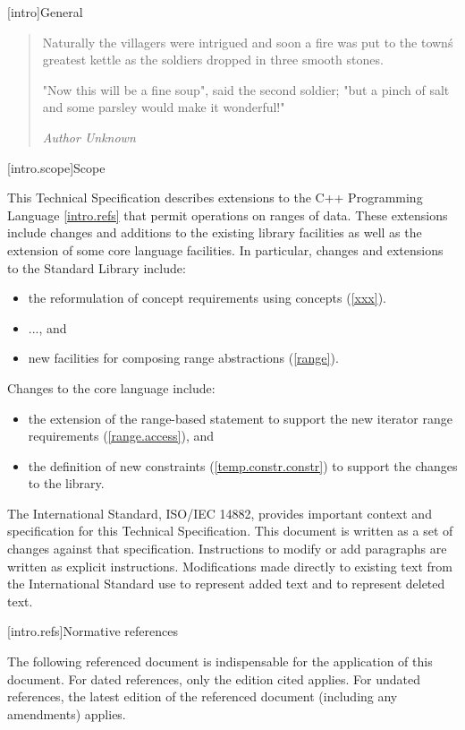 
[intro]{General}

\begin{quote}
Naturally the villagers were intrigued and soon a fire was put to the town\'s greatest
kettle as the soldiers dropped in three smooth stones.

"Now this will be a fine soup", said the second soldier;
"but a pinch of salt and some parsley would make it wonderful!"
\begin{flushright}
\textemdash \textit{Author Unknown}
\end{flushright}
\end{quote}

[intro.scope]{Scope}

\pnum
This Technical Specification describes extensions to the C++
Programming Language \ref{intro.refs} that
permit operations on ranges of data. These extensions include
changes and additions to the existing library facilities as well
as the extension of some core language facilities. In particular,
changes and extensions to the Standard Library include:
\begin{itemize}
\item the reformulation of concept requirements using concepts (\ref{xxx}).
\item ..., and
\item new facilities for composing range abstractions (\ref{range}).
\end{itemize}
%
Changes to the core language include:
\begin{itemize}
\item the extension of the range-based  statement to support
the new iterator range requirements (\ref{range.access}), and
\item the definition of new constraints (\ref{temp.constr.constr}) to
support the changes to the library.
\end{itemize}

\pnum
The International Standard, ISO/IEC 14882, provides important context
and specification for this Technical Specification. This document is
written as a set of changes against that specification. Instructions
to modify or add paragraphs are written as explicit instructions.
Modifications made directly to existing text from the International
Standard use  to represent added text and
 to represent deleted text.


[intro.refs]{Normative references}

\pnum
The following referenced document is indispensable for the
application of this document. For dated references, only the
edition cited applies. For undated references, the latest edition
of the referenced document (including any amendments) applies.

